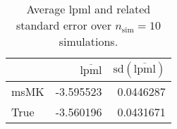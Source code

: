 \begin{table}[H]

\caption{Average lpml and related standard error over $n_{\text{sim}} = 10$ simulations.}
\centering
\begin{tabular}[t]{lrr}
\toprule
  & $\overbar{\text{lpml}}$ & $\text{sd}(\overbar{\text{lpml}})$\\
\midrule
msMK & -3.595523 & 0.0446287\\
True & -3.560196 & 0.0431671\\
\bottomrule
\end{tabular}
\end{table}